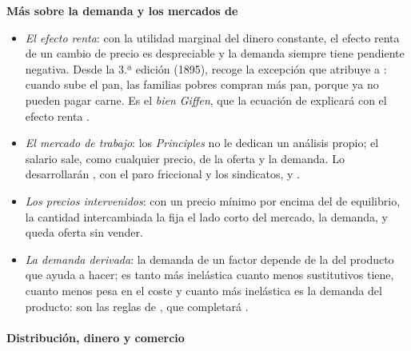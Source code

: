 \documentclass[11pt]{article}
\begin{document}
\begin{anotaciones}
\textbf{Más sobre la demanda y los mercados de }
\begin{itemize}
\item \emph{El efecto renta}: con la utilidad marginal del dinero constante, el efecto renta de un cambio de precio es despreciable y la demanda siempre tiene pendiente negativa. Desde la 3.ª edición (1895),  recoge la excepción que atribuye a : cuando sube el pan, las familias pobres compran más pan, porque ya no pueden pagar carne\nocite{Marshall1890Principles}. Es el \emph{bien Giffen}, que la ecuación de  explicará con el efecto renta .
\item \emph{El mercado de trabajo}: los \emph{Principles} no le dedican un análisis propio; el salario sale, como cualquier precio, de la oferta y la demanda. Lo desarrollarán \textcite{Hicks1932Theory}, con el paro friccional y los sindicatos, y \textcite{Pigou1933Theory} .
\item \emph{Los precios intervenidos}: con un precio mínimo por encima del de equilibrio, la cantidad intercambiada la fija el lado corto del mercado, la demanda, y queda oferta sin vender.
\item \emph{La demanda derivada}: la demanda de un factor depende de la del producto que ayuda a hacer; es tanto más inelástica cuanto menos sustitutivos tiene, cuanto menos pesa en el coste y cuanto más inelástica es la demanda del producto: son las reglas de , que completará  .
\end{itemize}
\end{anotaciones}

\paragraph{Distribución, dinero y comercio}
\end{document}
